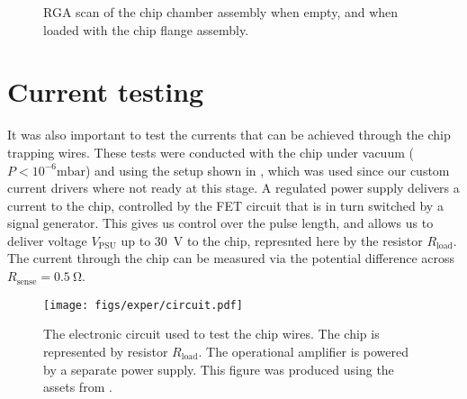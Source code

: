   \begin{figure}[htb]
  \centering
  \caption[RGA scan of empty and full chambers]{
    RGA scan of the chip chamber assembly when empty, and when loaded with the
  chip flange assembly.}
  \label{exper:fig:rga}
\end{figure}


\section{Current testing}
\label{exper:current}

It was also important to test the currents that can be achieved through the
chip trapping wires. These tests were conducted with the chip under vacuum
($P<10^{-6}\si{\milli\bar}$) and using the setup shown in
, which was used since our custom current drivers
where not ready at this stage. A regulated power supply delivers a current to
the chip, controlled by the FET circuit that is in turn switched by a signal
generator. This gives us control over the pulse length, and allows us to
deliver voltage $V_\text{PSU}$ up to \SI{30}{\volt} to the chip, represnted
here by the resistor $R_\text{load}$. The current through the chip can be
measured via the potential difference across $R_\text{sense} = \SI{0.5}{\ohm}$.

\begin{figure}[htb]
  \centering
  \texttt{[image: figs/exper/circuit.pdf]}
  \caption[Current testing electronics]{
    The electronic circuit used to test the chip wires. The chip is
  represented by resistor $R_\text{load}$. The operational amplifier is powered
  by a separate power supply. This figure was produced using the assets from
  .}
  \label{exper:fig:curtest}
\end{figure}


